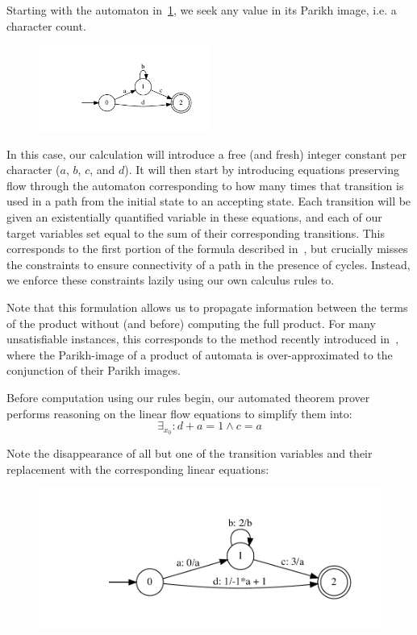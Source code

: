 \documentclass[runningheads]{llncs}
\begin{document}
Starting with the automaton in~\ref{fig:start}, we seek any value in its Parikh image, i.e. a character count.

\begin{figure}[h]
  \centering
  \label{fig:start}
  \includegraphics[width=0.5\textwidth]{trace-0}
  \end{figure}

  In this case, our calculation will introduce a free (and fresh) integer constant per character ($a$, $b$, $c$, and $d$). It will then start by introducing equations preserving flow through the automaton corresponding to how many times that transition is used in a path from the initial state to an accepting state. Each transition will be given an existentially quantified variable in these equations, and each of our target variables set equal to the sum of their corresponding transitions. This corresponds to the first portion of the formula described in~\cite{generate-parikh-image}, but crucially misses the constraints to ensure connectivity of a path in the presence of cycles. Instead, we enforce these constraints lazily using our own calculus rules to.
  
  Note that this formulation allows us to propagate information between the terms of the product without (and before) computing the full product. For many unsatisfiable instances, this corresponds to the method recently introduced in~\cite{approximate-parikh}, where the Parikh-image of a product of automata is over-approximated to the conjunction of their Parikh images.
  
Before computation using our rules begin, our automated theorem prover performs reasoning on the linear flow equations to simplify them into:
$$
\exists_{x_{0}} : d + a = 1 \land
c = a
$$

Note the disappearance of all but one of the transition variables and their replacement with the corresponding linear equations:

\begin{figure}[h]
  \centering
  \includegraphics[width=\textwidth]{trace-0-aut-0}
\end{figure}
  
\end{document}

